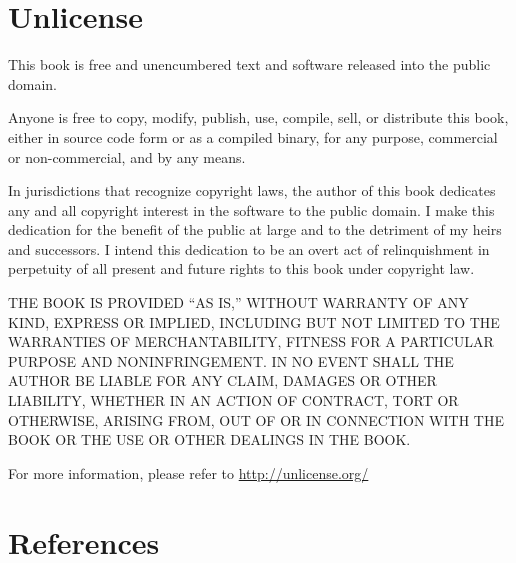 \documentclass[
  12pt,
]{book}
\theoremstyle{definition}
\theoremstyle{definition}
\theoremstyle{definition}
\theoremstyle{definition}
\theoremstyle{remark}
\begin{document}
\hypertarget{apunlicense}{%
\chapter{Unlicense}\label{apunlicense}}

This book is free and unencumbered text and software released into the public domain.

Anyone is free to copy, modify, publish, use, compile, sell, or
distribute this book, either in source code form or as a compiled
binary, for any purpose, commercial or non-commercial, and by any
means.

In jurisdictions that recognize copyright laws, the author
of this book dedicates any and all copyright interest in the
software to the public domain. I make this dedication for the benefit
of the public at large and to the detriment of my heirs and
successors. I intend this dedication to be an overt act of
relinquishment in perpetuity of all present and future rights to this
book under copyright law.

THE BOOK IS PROVIDED ``AS IS,'' WITHOUT WARRANTY OF ANY KIND,
EXPRESS OR IMPLIED, INCLUDING BUT NOT LIMITED TO THE WARRANTIES OF
MERCHANTABILITY, FITNESS FOR A PARTICULAR PURPOSE AND NONINFRINGEMENT.
IN NO EVENT SHALL THE AUTHOR BE LIABLE FOR ANY CLAIM, DAMAGES OR
OTHER LIABILITY, WHETHER IN AN ACTION OF CONTRACT, TORT OR OTHERWISE,
ARISING FROM, OUT OF OR IN CONNECTION WITH THE BOOK OR THE USE OR
OTHER DEALINGS IN THE BOOK.

For more information, please refer to \url{http://unlicense.org/}

\hypertarget{references}{%
\chapter*{References}\label{references}}
\end{document}
